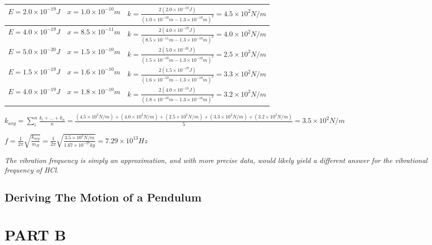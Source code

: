 \documentclass{article}
\begin{document}
\begin{center}
\begin{tabularx}{1\textwidth} { 
		| >{\raggedright\arraybackslash}X 
		| >{\centering\arraybackslash}X 
		| >{\raggedleft\arraybackslash}X | }
	\hline
	$E=2.0\times10^{-19}J$ & $x=1.0\times10^{-10}m$ & $k = \frac{2(2.0\times10^{-19}J)}{(1.0\times10^{-10}m - 1.3\times10^{-10}m)^2}=4.5\times10^{2}N/m $ \\
	\hline
	$E = 4.0\times10^{-19}J$  & $x = 8.5\times10^{-11}m $  & $k = \frac{2(4.0\times10^{-19}J)}{(8.5\times10^{-11}m - 1.3\times10^{-10}m)^2}=4.0\times10^{2}N/m $\\
	\hline
	$E = 5.0\times10^{-20}J$ & $x = 1.5\times10^{-10}m$ & $k = \frac{2(5.0\times10^{-20}J)}{(1.5\times10^{-10}m - 1.3\times10^{-10}m)^2}=2.5\times10^{2}N/m $ \\
	\hline
	$E = 1.5\times10^{-19}J$ & $x=1.6\times10^{-10}m$  & $k = \frac{2(1.5\times10^{-19}J)}{(1.6\times10^{-10}m - 1.3\times10^{-10}m)^2}=3.3\times10^{2}N/m $  \\
	\hline
	$E = 4.0\times10^{-19}J$  & $x = 1.8\times10^{-10}m$  & $k = \frac{2(4.0\times10^{-19}J)}{(1.8\times10^{-10}m - 1.3\times10^{-10}m)^2}=3.2\times10^{2}N/m $  \\
	\hline
\end{tabularx}
\end{center}
\begin{center}
	$k_{avg} = \sum_{i}^{n} \frac{k_i + ... +k_n}{n} = \frac{(4.5\times10^2N/m) + (4.0\times10^2N/m) + (2.5\times10^2N/m) + (3.3\times10^2N/m) + (3.2\times10^2N/m)}{5} = 3.5\times10^2N/m
	$
\end{center}
\begin{center}
$\boxed{f = \frac{1}{2\pi}\sqrt{\frac{k_{avg}}{m_H}} = \frac{1}{2\pi}\sqrt{\frac{3.5\times10^2N/m}{1.67\times10^{-27}kg}} = 7.29\times10^{13}Hz}
$
\end{center}
\textit{The vibration frequency is simply an approximation, and with more precise data, would likely yield a different answer for the vibrational frequency of HCl.}

\subsection{Deriving The Motion of a Pendulum}




















\section{PART B} 
\end{document}
